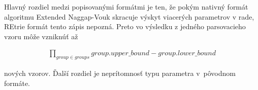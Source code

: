 Hlavný rozdiel medzi popisovanými formátmi je ten, že pokým nativný formát algoritmu Extended Naggap-Vouk skracuje výskyt viacerých parametrov v rade, REtrie formát tento zápis nepozná. Preto vo výsledku z jedného parsovacieho vzoru môže vzniknúť až

\begin{align*}
\prod_{group \in groups} group.upper\_bound - group.lower\_bound
\end{align*}

nových vzorov. Ďalší rozdiel je neprítomnosť typu parametra v~pô\-vodnom formáte.
